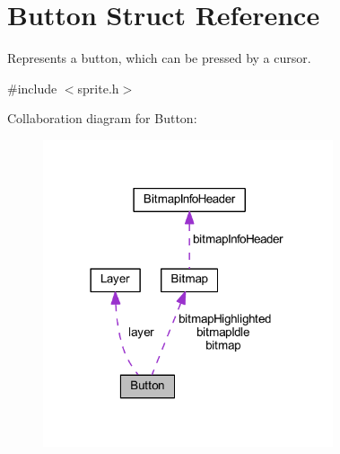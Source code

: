 \hypertarget{struct_button}{}\section{Button Struct Reference}
\label{struct_button}


Represents a button, which can be pressed by a cursor.  




{\ttfamily \#include $<$sprite.\+h$>$}



Collaboration diagram for Button\+:\nopagebreak
\begin{figure}[H]
\begin{center}
\leavevmode
\includegraphics[width=242pt]{struct_button__coll__graph}
\end{center}
\end{figure}
